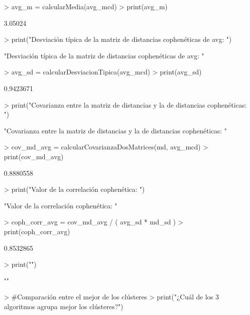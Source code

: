 \documentclass[parskip=full]{scrartcl}
\begin{document}
\begin{Schunk}
\begin{Sinput}
> avg_m = calcularMedia(avg_mcd)
> print(avg_m)
\end{Sinput}
\begin{Soutput}
[1] 3.05024
\end{Soutput}
\begin{Sinput}
> print("Desviación típica de la matriz de distancias cophenéticas de avg: ")
\end{Sinput}
\begin{Soutput}
[1] "Desviación típica de la matriz de distancias cophenéticas de avg: "
\end{Soutput}
\begin{Sinput}
> avg_sd = calcularDesviacionTipica(avg_mcd)
> print(avg_sd)
\end{Sinput}
\begin{Soutput}
[1] 0.9423671
\end{Soutput}
\begin{Sinput}
> print("Covarianza entre la matriz de distancias y la de distancias cophenéticas: ")
\end{Sinput}
\begin{Soutput}
[1] "Covarianza entre la matriz de distancias y la de distancias cophenéticas: "
\end{Soutput}
\begin{Sinput}
> cov_md_avg = calcularCovarianzaDosMatrices(md, avg_mcd)
> print(cov_md_avg)
\end{Sinput}
\begin{Soutput}
[1] 0.8880558
\end{Soutput}
\begin{Sinput}
> print("Valor de la correlación cophenética: ")
\end{Sinput}
\begin{Soutput}
[1] "Valor de la correlación cophenética: "
\end{Soutput}
\begin{Sinput}
> coph_corr_avg = cov_md_avg / ( avg_sd * md_sd )
> print(coph_corr_avg)
\end{Sinput}
\begin{Soutput}
[1] 0.8532865
\end{Soutput}
\begin{Sinput}
> print("")
\end{Sinput}
\begin{Soutput}
[1] ""
\end{Soutput}
\begin{Sinput}
> #Comparación entre el mejor de los clústeres
> print("¿Cuál de los 3 algoritmos agrupa mejor los clústeres?")

\end{Sinput}
\end{Schunk}
\end{document}
